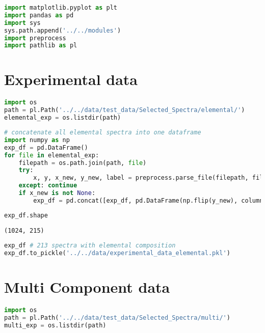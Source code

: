 \begin{lstlisting}[language=Python]
import matplotlib.pyplot as plt
import pandas as pd
import sys
sys.path.append('../../modules')
import preprocess
import pathlib as pl
\end{lstlisting}

\hypertarget{experimental-data}{%
\section{Experimental data}\label{experimental-data}}

\begin{lstlisting}[language=Python]
import os
path = pl.Path('../../data/test_data/Selected_Spectra/elemental/')
elemental_exp = os.listdir(path)
\end{lstlisting}

\begin{lstlisting}[language=Python]
# concatenate all elemental spectra into one dataframe
import numpy as np
exp_df = pd.DataFrame()
for file in elemental_exp:
    filepath = os.path.join(path, file)
    try:
        x, y, x_new, y_new, label = preprocess.parse_file(filepath, filetype='vms', scale=True, N_points=1024)
    except: continue
    if x_new is not None:
        exp_df = pd.concat([exp_df, pd.DataFrame(np.flip(y_new), columns=['_'.join(label)])], axis=1)
\end{lstlisting}

\begin{lstlisting}[language=Python]
exp_df.shape
\end{lstlisting}

\begin{lstlisting}
(1024, 215)
\end{lstlisting}

\begin{lstlisting}[language=Python]
exp_df # 213 spectra with elemental composition
exp_df.to_pickle('../../data/experimental_data_elemental.pkl')
\end{lstlisting}

\hypertarget{multi-component-data}{%
\section{Multi Component data}\label{multi-component-data}}

\begin{lstlisting}[language=Python]
import os
path = pl.Path('../../data/test_data/Selected_Spectra/multi/')
multi_exp = os.listdir(path)
\end{lstlisting}

